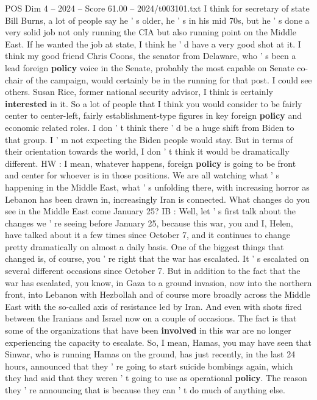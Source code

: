 \begin{textsample}{POS Dim 4 – 2024 – Score 61.00 – 2024/t003101.txt}
I think for secretary of state Bill Burns, a lot of people say he ' s older, he ' s in his mid 70s, but he ' s done a very solid job not only running the CIA but also running point on the Middle East.
If he wanted the job at state, I think he ' d have a very good shot at it.
I think my good friend Chris Coons, the senator from Delaware, who ' s been a lead foreign \textbf{policy} voice in the Senate, probably the most capable on Senate co-chair of the campaign, would certainly be in the running for that post.
I could see others.
Susan Rice, former national security advisor, I think is certainly \textbf{interested} in it.
So a lot of people that I think you would consider to be fairly center to center-left, fairly establishment-type figures in key foreign \textbf{policy} and economic related roles.
I don ' t think there ' d be a huge shift from Biden to that group.
I ' m not expecting the Biden people would stay.
But in terms of their orientation towards the world, I don ' t think it would be dramatically different.
HW : I mean, whatever happens, foreign \textbf{policy} is going to be front and center for whoever is in those positions.
We are all watching what ' s happening in the Middle East, what ' s unfolding there, with increasing horror as Lebanon has been drawn in, increasingly Iran is connected.
What changes do you see in the Middle East come January 25?
IB : Well, let ' s first talk about the changes we ' re seeing before January 25, because this war, you and I, Helen, have talked about it a few times since October 7, and it continues to change pretty dramatically on almost a daily basis.
One of the biggest things that changed is, of course, you ' re right that the war has escalated.
It ' s escalated on several different occasions since October 7.
But in addition to the fact that the war has escalated, you know, in Gaza to a ground invasion, now into the northern front, into Lebanon with Hezbollah and of course more broadly across the Middle East with the so-called axis of resistance led by Iran.
And even with shots fired between the Iranians and Israel now on a couple of occasions.
The fact is that some of the organizations that have been \textbf{involved} in this war are no longer experiencing the capacity to escalate.
So, I mean, Hamas, you may have seen that Sinwar, who is running Hamas on the ground, has just recently, in the last 24 hours, announced that they ' re going to start suicide bombings again, which they had said that they weren ' t going to use as operational \textbf{policy}.
The reason they ' re announcing that is because they can ' t do much of anything else.

\end{textsample}
